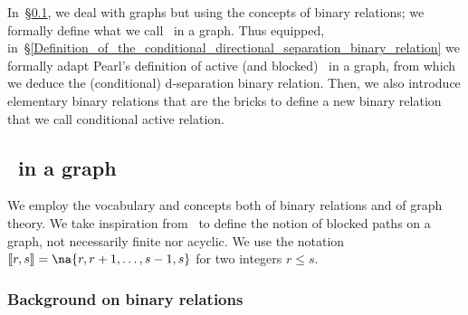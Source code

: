 \documentclass[12pt]{article}
\def\citep#1{\cite{#1}}
\begin{document}
In~\S\ref{UndirectedEdgePaths_in_a_graph}, we deal with
graphs but using the concepts of binary relations;
we formally define what we call \undirectedEdgePaths\ in a graph.
Thus equipped, in~\S\ref{Definition_of_the_conditional_directional_separation_binary_relation}
we formally adapt Pearl's definition of active (and blocked)
\undirectedEdgePaths\ in a graph,
from which we deduce the (conditional) d-separation binary relation.
Then, we also introduce elementary binary relations that are the bricks
to define a new binary relation that we call conditional active relation.

\subsection{\UndirectedEdgePaths\ in a graph}
\label{UndirectedEdgePaths_in_a_graph}

We employ the vocabulary and concepts both of binary relations and of graph theory.
% 
We take inspiration from~\citep{PEARL1986357} to define the notion of blocked paths
on a graph, not necessarily finite nor acyclic.
% 
We use the notation \( \ic{r,s}=\na{r,r+1,\ldots,s-1,s} \) for two integers $r \leq s$.

\subsubsection{Background on binary relations}
\end{document}
